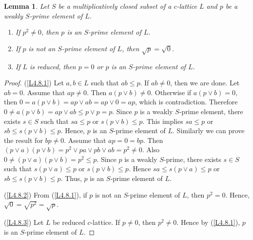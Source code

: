 \documentclass[10pt,twoside,a4paper]{amsart}
\numberwithin{equation}{section}
\theoremstyle{plain}
\newtheorem{lem}{Lemma}[section]
\theoremstyle{definition}
\begin{document}
\begin{lem}\label{L4.8}
	Let $S$ be a multiplicatively closed subset of a $c$-lattice $L$ and $p$ be a weakly $S$-prime element of $L$.
	\begin{enumerate}
		\item\label{L4.8.1} If $p^2\neq 0$, then $p$ is an $S$-prime element of $L$.
		\item\label{L4.8.2} If $p$ is not an $S$-prime element of $L$, then $\sqrt{p}=\sqrt{0}$. 
		\item\label{L4.8.3} If $L$ is reduced, then $p=0$ or $p$ is an  $S$-prime element of $L$.
		
	\end{enumerate}
\end{lem}
\begin{proof}
	(\ref{L4.8.1}) Let $a,b\in L$ such that $ab\leq p$. If $ab\neq 0$, then we are done. Let $ab=0$. Assume that $ap\neq 0$. Then $a(p\vee b)\neq 0$. Otherwise if $a(p\vee b)=0$, then $0=a(p\vee b)=ap\vee ab=ap\vee 0=ap$, which is contradiction. Therefore $0\neq a(p\vee b)=ap\vee ab\leq p\vee p=p$. Since $p$ is a weakly $S$-prime element, there exists $s\in S$ such that $sa\leq p$ or $s(p\vee b)\leq p$. This implies $sa\leq p$ or $sb\leq s(p\vee b)\leq p$. Hence, $p$ is an $S$-prime element of $L$. Similarly we can prove the result for $bp\neq 0$. Assume that $ap=0=bp$. Then $(p\vee a)(p\vee b)=p^2\vee pa\vee pb\vee ab=p^2\neq 0$. Also $0\neq (p\vee a)(p\vee b)=p^2\leq p$. Since $p$ is a weakly $S$-prime, there exists $s\in S$ such that $s(p\vee a)\leq p$ or $s(p\vee b)\leq p$. Hence $sa\leq s(p\vee a)\leq p$ or $sb\leq s(p\vee b)\leq p$. Thus, $p$ is an $S$-prime element of $L$.
	
	(\ref{L4.8.2}) From (\ref{L4.8.1}), if $p$ is not an $S$-prime element of $L$, then $p^2=0$. Hence, $\sqrt{0}=\sqrt{p^2}=\sqrt{p}$.
	
	(\ref{L4.8.3}) Let $L$ be reduced $c$-lattice. If $p\neq 0$, then $p^2\neq 0$. Hence by (\ref{L4.8.1}), $p$ is an $S$-prime element of $L$.  \end{proof}
\end{document}
